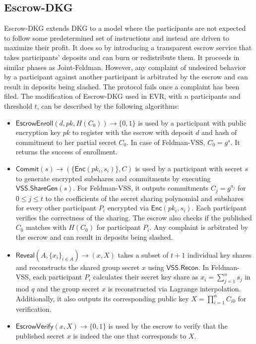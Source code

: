 \documentclass[letterpaper,twocolumn,10pt]{article}
\theoremstyle{definition}
\theoremstyle{remark}
\begin{document}
\subsection{Escrow-DKG}
\label{appendix:edkg}
Escrow-DKG \cite{david2019rational} extends DKG to a model where the participants are not expected to follow some predetermined set of instructions and instead are driven to maximize their profit. It does so by introducing a transparent escrow service that takes participants' deposits and can burn or redistribute them. It proceeds in similar phases as Joint-Feldman. However, any complaint of undesired behavior by a participant against another participant is arbitrated by the escrow and can result in deposits being slashed. The protocol fails once a complaint has been filed. The modification of Escrow-DKG used in EVR, with $n$ participants and threshold $t$, can be described by the following algorithms:
\begin{itemize}
    \item $\mathsf{EscrowEnroll}(d, pk, H(C_{0})) \rightarrow \{0,1\}$ is used by a participant with public encryption key $pk$ to register with the escrow with deposit $d$ and hash of commitment to her partial secret $C_{0}$. In case of Feldman-VSS, $C_{0} = g^{s}$. It returns the success of enrollment.
    
    \item $\mathsf{Commit}(s) \rightarrow (\{\mathsf{Enc}(pk_i, s_{i})\}, C)$ is used by a participant with secret $s$ to generate encrypted subshares and commitments by executing $\mathsf{VSS.ShareGen}(s)$. For Feldman-VSS, it outputs commitments $C_j = g^{a_j}$ for $0 \le j \le t$ to the coefficients of the secret sharing polynomial and subshares for every other participant $P_i$ encrypted via $\mathsf{Enc}(pk_i, s_{i})$. Each participant verifies the correctness of the sharing. The escrow also checks if the published $C_{0}$ matches with $H(C_{0})$ for participant $P_i$. Any complaint is arbitrated by the escrow and can result in deposits being slashed.
    
    \item $\mathsf{Reveal}(A, \{x_i\}_{i \in A}) \rightarrow (x, X)$ takes a subset of $t + 1$ individual key shares and reconstructs the shared group secret $x$ using $\mathsf{VSS.Recon}$. In Feldman-VSS, each participant $P_i$ calculates their secret key share as $x_i = \sum_{j=1}^{n} s_j$ in mod $q$ and the group secret $x$ is reconstructed via Lagrange interpolation. Additionally, it also outputs its corresponding public key $X = \prod_{i=1}^{n} C_{i0}$ for verification.
    
    \item $\mathsf{EscrowVerify}(x, X)\rightarrow\{0,1\}$ is used by the escrow to verify that the published secret $x$ is indeed the one that corresponds to $X$.
\end{itemize}
\end{document}
